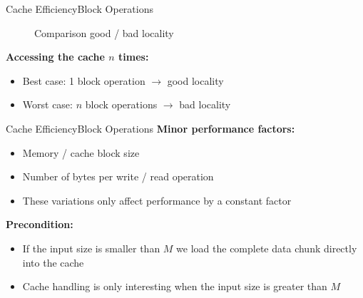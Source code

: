 
\begin{frame}{Cache Efficiency}{Block Operations}
  \vspace{-2.0em}
  \begin{figure}%
    \begin{adjustbox}{width=\linewidth}%
    \end{adjustbox}%
    \caption{Comparison good / bad locality}
    \label{fig:caching:memory_locality}
  \end{figure}%
  \textbf{Accessing the cache $n$ times:}
  \begin{itemize}
    \item
      {\color{Mittel-Blau}Best case}:
      1 block operation $\rightarrow$ good locality
    \item
      {\color{Mittel-Blau}Worst case}:
      $n$ block operations $\rightarrow$ bad locality
  \end{itemize}
\end{frame}


\begin{frame}{Cache Efficiency}{Block Operations}
  \textbf{Minor performance factors:}\\
  \begin{itemize}
    \item
      Memory / cache block size
    \item
      Number of bytes per write / read operation
    \item
      These variations only affect performance by a constant factor
  \end{itemize}
  \vspace{1.0em}
  \textbf{Precondition:}\\
  \begin{itemize}
    \item
      If the {\color{Mittel-Blau}input size} is
      {\color{Mittel-Blau}smaller than $M$} we load the complete data chunk
      directly into the cache
    \item
      Cache handling is only interesting when the
      {\color{Mittel-Blau}input size} is
      {\color{Mittel-Blau}greater than $M$}
  \end{itemize}
\end{frame}

